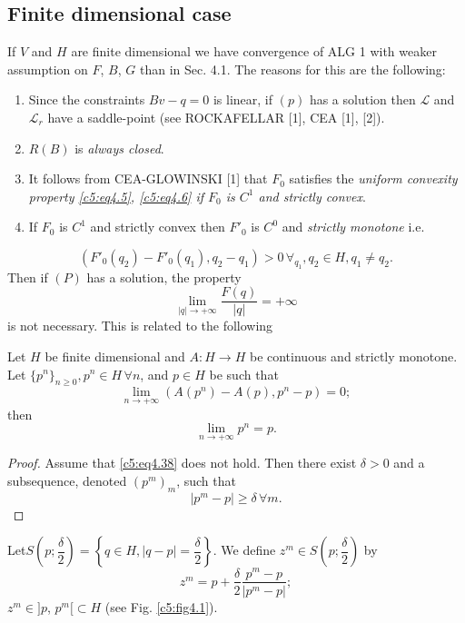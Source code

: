   
\subsection{Finite dimensional case}\label{c5:ss4.2}%
  
If $V$ and $H$ are finite dimensional we have convergence of ALG 1 with weaker assumption on $F$, $B$, $G$ than in Sec. 4.1.  The reasons for this are the following:
\begin{enumerate}[(1)]
\item Since the constraints $Bv-q =0$ is linear, if $(p)$ has a solution then $\mathscr{L}$ and $\mathscr{L}_r$ have a saddle-point (see ROCKAFELLAR [1], CEA [1], [2]).
\item $R (B)$ is \textit{always closed}.
\item It follows from CEA-GLOWINSKI [1] that $F_0$ satisfies the \textit{uniform convexity property \eqref{c5:eq4.5}, \eqref{c5:eq4.6} if $F_0$ is $C^1$ and strictly convex}.
\item If $F_0$ is $C^1$ and strictly convex then $F'_0$ is $C^0$ and \textit{strictly monotone} i.e. 
 \end{enumerate}
 $$
 (F'_0 (q_2) - F'_0 (q_1), q_2 - q_1) > 0\, \forall_{q_1}, q_2 \in H, q_1 \neq q _2.
 $$  
 Then if $(P)$ has a solution, the property
 $$
 \lim_{| q |\to + \infty} \frac{F(q)}{| q |} = + \infty
 $$ 
 is not necessary. This is related to the following
 \begin{lemma}\label{c5:lem4.1}%
Let $H$ be finite dimensional and $A : H \to H$ be continuous and strictly monotone. Let $\{p^n \}_{n \geq 0}, p^n \in H\, \forall n$, and $p \in H$ be such that 
\begin{equation}
\lim_{n  \to + \infty} (A (p^n) - A (p), p^n - p) = 0; \tag{4.37}\label{c5:eq4.37}
\end{equation} 
then 
\begin{equation}
\lim_{n \to + \infty} p^n = p.\tag{4.38}\label{c5:eq4.38}
\end{equation}
 \end{lemma} 
 
 \begin{proof}
Assume that \eqref{c5:eq4.38} does not hold. Then there exist $\delta > 0$ and a subsequence, denoted $(p^m)_m$, such that 
\begin{equation}
| p^m - p | \geq \delta\, \forall m.\tag{4.39}\label{c5:eq4.39}
\end{equation}
 \end{proof} 
 Let\pageoriginale  $S \left(p ; \dfrac{\delta}{2}\right) = \left\{q \in H, |q -
 p| = \dfrac{\delta}{2}\right\}$. We define $z^m \in S\left(p;
 \dfrac{\delta}{2}\right)$ by  
 \begin{equation}
z^m = p + \frac{\delta}{2} \frac{p^m - p}{|p^m - p|};\tag{4.40}\label{c5:eq4.40}
 \end{equation} 
 $z^m \in ] p$, $p^m[ \subset H$ (see Fig. \ref{c5:fig4.1}).

